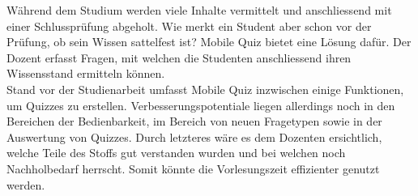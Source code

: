 

Während dem Studium werden viele Inhalte vermittelt und anschliessend mit einer Schlussprüfung abgeholt. Wie merkt ein Student aber schon vor der Prüfung, ob sein Wissen sattelfest ist? Mobile Quiz bietet eine Lösung dafür. Der Dozent erfasst Fragen, mit welchen die Studenten anschliessend ihren Wissensstand ermitteln können. \\
Stand vor der Studienarbeit umfasst Mobile Quiz inzwischen einige Funktionen, um Quizzes zu erstellen. Verbesserungspotentiale liegen allerdings noch in den Bereichen der Bedienbarkeit, im Bereich von neuen Fragetypen sowie in der Auswertung von Quizzes. Durch letzteres wäre es dem Dozenten ersichtlich, welche Teile des Stoffs gut verstanden wurden und bei welchen noch Nachholbedarf herrscht. Somit könnte die Vorlesungszeit effizienter genutzt werden.
\\
\\


